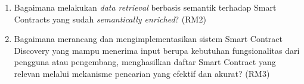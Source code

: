 \begin{enumerate}
	\item Bagaimana melakukan \textit{data retrieval} berbasis semantik terhadap Smart Contracts yang sudah \textit{semantically enriched}? (RM2)

	\item Bagaimana merancang dan mengimplementasikan sistem Smart Contract Discovery yang mampu menerima input berupa kebutuhan fungsionalitas dari pengguna atau pengembang, menghasilkan daftar Smart Contract yang relevan melalui mekanisme pencarian yang efektif dan akurat? (RM3)



\end{enumerate}



